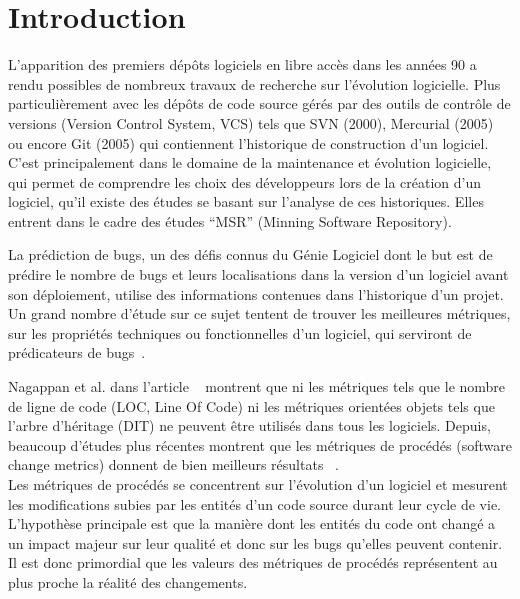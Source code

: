 \section{Introduction}
\label{sec:intro}

L'apparition des premiers dépôts logiciels en libre accès dans les années 90 a rendu possibles de nombreux travaux de recherche sur l'évolution logicielle. Plus particulièrement avec les dépôts de code source gérés par des outils de contrôle de versions (Version Control System, VCS) tels que  SVN (2000), Mercurial (2005) ou encore Git (2005) qui contiennent l'historique de construction d'un logiciel.\\  

C'est principalement dans le domaine de la maintenance et évolution logicielle, qui permet de comprendre les choix des développeurs lors de la création d'un logiciel, qu'il existe des études se basant sur l'analyse de ces historiques. Elles entrent dans le cadre des études ``MSR'' (Minning Software Repository).

La prédiction de bugs, un des défis connus du Génie Logiciel dont le but est de prédire le nombre de bugs et leurs localisations dans la version d'un logiciel avant son déploiement, utilise des informations contenues dans l'historique d'un projet. Un grand nombre d'étude sur ce sujet tentent de trouver les meilleures métriques, sur les propriétés techniques ou fonctionnelles d'un logiciel, qui serviront de prédicateurs de bugs~\cite{fenton_critique_1999}.

Nagappan et al. dans l'article ~\cite{nagappan_mining_2006} montrent que ni les métriques tels que le nombre de ligne de code (LOC, Line Of Code) ni les métriques orientées objets tels que l'arbre d'héritage (DIT) ne peuvent être utilisés dans tous les logiciels. Depuis, beaucoup d'études plus récentes montrent que les métriques de procédés (software change metrics) donnent de bien meilleurs résultats ~\cite{nagappan_use_2005,weyuker_too_2008,bird_dont_2011,giger_can_2012}.\\

Les métriques de procédés se concentrent sur l'évolution d'un logiciel et mesurent les modifications subies par les entités d'un code source durant leur cycle de vie. L'hypothèse principale est que la manière dont les entités du code ont changé a un impact majeur sur leur qualité et donc sur les bugs qu'elles peuvent contenir. Il est donc primordial que les valeurs des métriques de procédés représentent au plus proche la réalité des changements.

